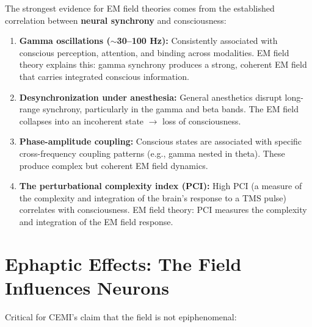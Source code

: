 \documentclass[11pt,a4paper]{report}
\begin{document}
The strongest evidence for EM field theories comes from the established correlation between \textbf{neural synchrony} and consciousness:

\begin{evidbox}
\begin{enumerate}[leftmargin=1.5em]
  \item \textbf{Gamma oscillations ($\sim$30--100 Hz):} Consistently associated with conscious perception, attention, and binding across modalities. EM field theory explains this: gamma synchrony produces a strong, coherent EM field that carries integrated conscious information.
  \item \textbf{Desynchronization under anesthesia:} General anesthetics disrupt long-range synchrony, particularly in the gamma and beta bands. The EM field collapses into an incoherent state $\to$ loss of consciousness.
  \item \textbf{Phase-amplitude coupling:} Conscious states are associated with specific cross-frequency coupling patterns (e.g., gamma nested in theta). These produce complex but coherent EM field dynamics.
  \item \textbf{The perturbational complexity index (PCI):} High PCI (a measure of the complexity and integration of the brain's response to a TMS pulse) correlates with consciousness. EM field theory: PCI measures the complexity and integration of the EM field response.
\end{enumerate}
\end{evidbox}

\section{Ephaptic Effects: The Field Influences Neurons}

Critical for CEMI's claim that the field is not epiphenomenal:
\end{document}
